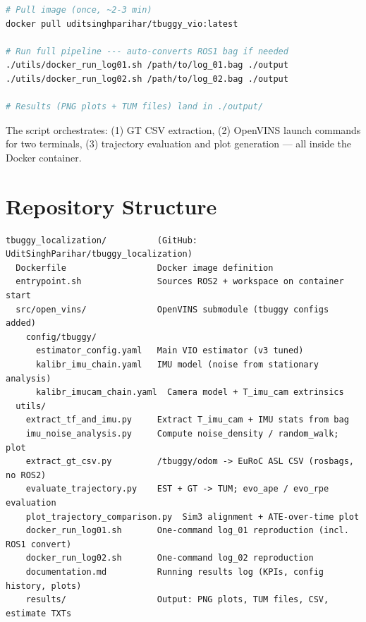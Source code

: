 \documentclass[10pt,a4paper]{article}
\begin{document}
\begin{lstlisting}[language=bash, caption={One-command reproduction (ROS1 bag or ROS2 directory)}]
# Pull image (once, ~2-3 min)
docker pull uditsinghparihar/tbuggy_vio:latest

# Run full pipeline --- auto-converts ROS1 bag if needed
./utils/docker_run_log01.sh /path/to/log_01.bag ./output
./utils/docker_run_log02.sh /path/to/log_02.bag ./output

# Results (PNG plots + TUM files) land in ./output/
\end{lstlisting}

The script orchestrates: (1) GT CSV extraction, (2) OpenVINS launch commands for two
terminals, (3) trajectory evaluation and plot generation --- all inside the Docker container.

\appendix
\section*{Repository Structure}

\begin{lstlisting}
tbuggy_localization/          (GitHub: UditSinghParihar/tbuggy_localization)
  Dockerfile                  Docker image definition
  entrypoint.sh               Sources ROS2 + workspace on container start
  src/open_vins/              OpenVINS submodule (tbuggy configs added)
    config/tbuggy/
      estimator_config.yaml   Main VIO estimator (v3 tuned)
      kalibr_imu_chain.yaml   IMU model (noise from stationary analysis)
      kalibr_imucam_chain.yaml  Camera model + T_imu_cam extrinsics
  utils/
    extract_tf_and_imu.py     Extract T_imu_cam + IMU stats from bag
    imu_noise_analysis.py     Compute noise_density / random_walk; plot
    extract_gt_csv.py         /tbuggy/odom -> EuRoC ASL CSV (rosbags, no ROS2)
    evaluate_trajectory.py    EST + GT -> TUM; evo_ape / evo_rpe evaluation
    plot_trajectory_comparison.py  Sim3 alignment + ATE-over-time plot
    docker_run_log01.sh       One-command log_01 reproduction (incl. ROS1 convert)
    docker_run_log02.sh       One-command log_02 reproduction
    documentation.md          Running results log (KPIs, config history, plots)
    results/                  Output: PNG plots, TUM files, CSV, estimate TXTs
\end{lstlisting}
\end{document}
